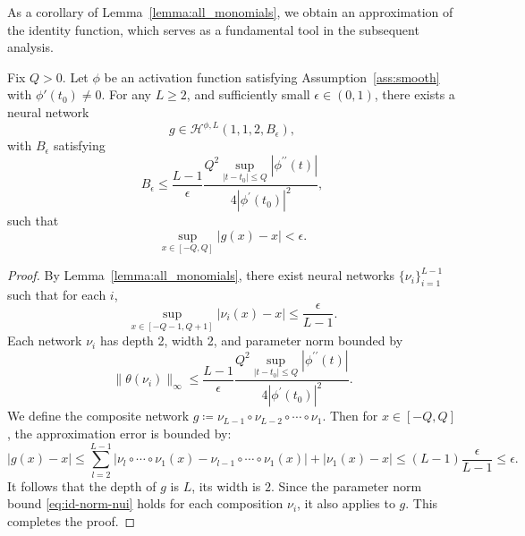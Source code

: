 \documentclass[11pt]{article}
\begin{document}
As a corollary of Lemma~\ref{lemma:all_monomials}, we obtain an approximation of the identity function, which serves as a fundamental tool in the subsequent analysis.
\begin{corollary}
\label{corol:id-approx} Fix $Q>0$. Let $\phi$ be an activation function satisfying Assumption~\ref{ass:smooth} with $\phi'(t_0) \neq 0$. For any $L \geq 2$, and sufficiently small $\epsilon \in(0,1)$, there exists a neural network
\begin{equation*}
    g \in \mathcal{H}^{\phi,L}(1, 1, 2, B_{\epsilon}),
\end{equation*}
with $B_{\epsilon}$ satisfying
\begin{equation*}
    B_{\epsilon} \leq \frac{L-1}{\epsilon} \frac{Q^2 \sup_{|t- t_0| \leq Q} |\phi^{\prime \prime}(t)|}{4 |\phi^{\prime}(t_0)|^2},
\end{equation*}
such that
\begin{equation*}
    \sup_{x \in [-Q,Q]} |g(x) - x| < \epsilon.
\end{equation*}
\end{corollary}
\begin{proof}
   By Lemma~\ref{lemma:all_monomials}, there exist neural networks $\{\nu_i\}_{i=1}^{L-1}$ such that for each $i$,
    \begin{equation*}
        \sup_{x \in [-Q-1, Q+1]} |\nu_i(x) - x| \leq \frac{\epsilon}{L-1}.
    \end{equation*}
    Each network $\nu_i$ has depth 2, width 2, and parameter norm bounded by
    \begin{equation}
        \|\theta(\nu_i)\|_{\infty}\leq \frac{L-1}{\epsilon} \frac{Q^2 \sup_{|t- t_0| \leq Q} |\phi^{\prime \prime}(t)|}{4 |\phi^{\prime}(t_0)|^2}.
        \label{eq:id-norm-nui}
    \end{equation}
    We define the composite network $g \coloneqq \nu_{L-1} \circ \nu_{L-2} \circ \cdots \circ \nu_1$. Then for $x \in [-Q, Q]$, the approximation error is bounded by:
    \begin{equation*}
        |g(x) - x| \leq \sum_{l=2}^{L-1} |\nu_{l} \circ \cdots \circ \nu_1(x) - \nu_{l-1} \circ \cdots \circ \nu_1(x)| + |\nu_1(x) -x| \leq (L-1) \frac{\epsilon}{L-1} \leq \epsilon.
    \end{equation*}
    It follows that the depth of $g$ is $L$, its width is $2$. Since the parameter norm bound \eqref{eq:id-norm-nui} holds for each composition $\nu_i$, it also applies to $g$.
    This completes the proof.
\end{proof}
\end{document}
